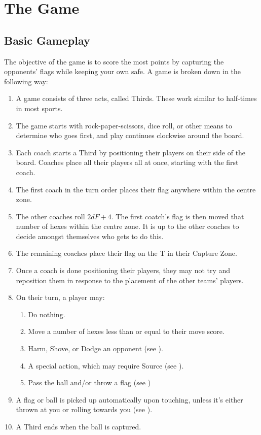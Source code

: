 \chapter{The Game}
\section{Basic Gameplay} \label{basic-gameplay}
The objective of the game is to score the most points by capturing the opponents' flags while keeping your own safe.
A game is broken down in the following way:
\begin{enumerate}
    \item A game consists of three acts, called Thirds.
    These work similar to half-times in most sports.
    \item The game starts with rock-paper-scissors, dice roll, or other means to determine who goes first, and play continues clockwise around the board.
    \item Each coach starts a Third by positioning their players on their side of the board.
    Coaches place all their players all at once, starting with the first coach.
    \item The first coach in the turn order places their flag anywhere within the centre zone.
    \item The other coaches roll $2dF+4$. The first coatch's flag is then moved that number of hexes within the centre zone.
    It is up to the other coaches to decide amongst themselves who gets to do this.
    \item The remaining coaches place their flag on the T in their Capture Zone.
    \item Once a coach is done positioning their players, they may not try and reposition them in response to the placement of the other teams' players.
    \item On their turn, a player may:
    \begin{enumerate}
        \item Do nothing.
        \item Move a number of hexes less than or equal to their move score.
        \item Harm, Shove, or Dodge an opponent (see ).
        \item A special action, which may require Source (see ).
        \item Pass the ball and/or throw a flag (see )
    \end{enumerate}
    \item A flag or ball is picked up automatically upon touching, unless it’s either thrown at you or rolling towards you (see ).
    \item A Third ends when the ball is captured.
\end{enumerate}


